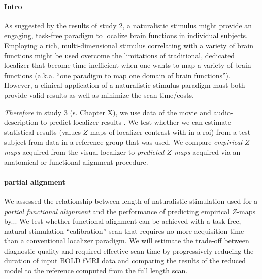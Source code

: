 

\paragraph{Intro}




As suggested by the results of study 2, a naturalistic stimulus might provide an
engaging, task-free paradigm to localize brain functions in individual subjects.
%
Employing a rich, multi-dimensional stimulus correlating with a variety of brain
functions might be used overcome the limitations of traditional, dedicated
localizer that become time-inefficient when one wants to map a variety of brain
functions (a.k.a. ``one paradigm to map one domain of brain functions'').
However, a clinical application of a naturalistic stimulus paradigm must both
provide valid results as well as minimize the scan time/costs.



\textit{Therefore} in study 3 (s. Chapter X), we use data of the movie and
audio-description to predict localizer results \citep{sengupta2016extension}.
We test whether we can estimate statistical results (values $Z$-maps of
localizer contrast with in a \ac{roi}) from a test subject from data in a
reference group that was used.
%
We compare \textit{empirical $Z$-maps} acquired from the visual localizer to
\textit{predicted $Z$-maps} acquired via an anatomical or functional alignment
procedure.

\paragraph{partial alignment}

We assessed the relationship between length of naturalistic stimulation used
for a \textit{partial functional alignment} and the performance of predicting
empirical $Z$-maps by...
%
We test whether functional alignment can be achieved with a task-free, natural
stimulation ``calibration'' scan that requires no more acquisition time than a
conventional localizer paradigm.
%
We will estimate the trade-off between diagnostic quality and required effective
scan time by progressively reducing the duration of input BOLD fMRI data and
comparing the results of the reduced model to the reference computed from the
full length scan.


